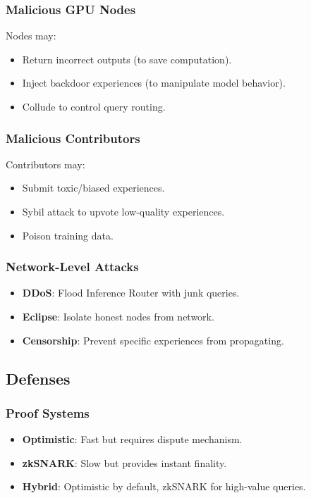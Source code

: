 \documentclass[11pt,a4paper]{article}
\begin{document}
\subsubsection{Malicious GPU Nodes}

Nodes may:
\begin{itemize}
\item Return incorrect outputs (to save computation).
\item Inject backdoor experiences (to manipulate model behavior).
\item Collude to control query routing.
\end{itemize}

\subsubsection{Malicious Contributors}

Contributors may:
\begin{itemize}
\item Submit toxic/biased experiences.
\item Sybil attack to upvote low-quality experiences.
\item Poison training data.
\end{itemize}

\subsubsection{Network-Level Attacks}

\begin{itemize}
\item \textbf{DDoS}: Flood Inference Router with junk queries.
\item \textbf{Eclipse}: Isolate honest nodes from network.
\item \textbf{Censorship}: Prevent specific experiences from propagating.
\end{itemize}

\subsection{Defenses}

\subsubsection{Proof Systems}

\begin{itemize}
\item \textbf{Optimistic}: Fast but requires dispute mechanism.
\item \textbf{zkSNARK}: Slow but provides instant finality.
\item \textbf{Hybrid}: Optimistic by default, zkSNARK for high-value queries.
\end{itemize}
\end{document}
